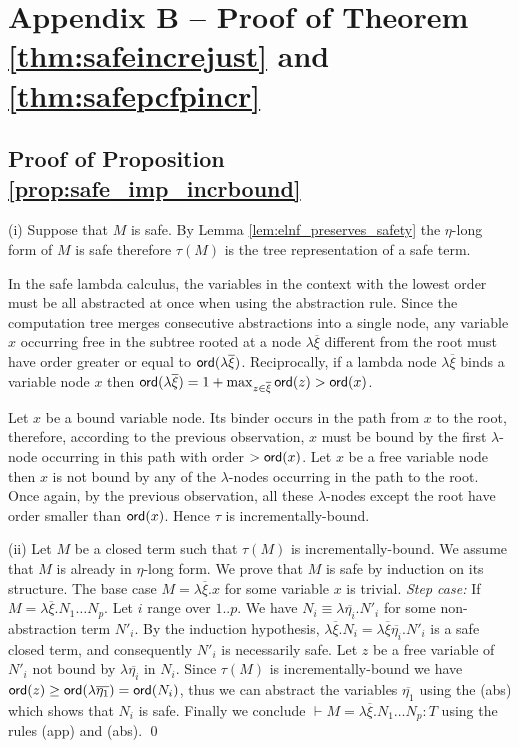 \documentclass{llncs}
\newcommand\ord[1]{{\sf
    ord}(#1)} \newcommand\typear{\rightarrow}
\begin{document}
\section*{Appendix B -- Proof of Theorem \ref{thm:safeincrejust} and \ref{thm:safepcfpincr}}

\subsection{Proof of Proposition \ref{prop:safe_imp_incrbound}}
  (i) Suppose that $M$ is safe. By Lemma
  \ref{lem:elnf_preserves_safety} the $\eta$-long form of $M$ is safe
  therefore $\tau(M)$ is the tree representation of a safe term.

In the safe lambda calculus, the variables in the context with the
lowest order must be all abstracted at once when using the abstraction
rule. Since the computation tree merges consecutive abstractions into
a single node, any variable $x$ occurring free in the subtree rooted
at a node $\lambda \overline{\xi}$ different from the root must have
order greater or equal to $\ord{\lambda
  \overline{\xi}}$. Reciprocally, if a lambda node $\lambda
\overline{\xi}$ binds a variable node $x$ then $\ord{\lambda
  \overline{\xi}} = 1+\max_{z\in\overline{\xi}} \ord{z} > \ord{x}$.

Let $x$ be a bound variable node. Its binder occurs in the path from
$x$ to the root, therefore, according to the previous observation, $x$
must be bound by the first $\lambda$-node occurring in this path with
order $>\ord{x}$. Let $x$ be a free variable node then $x$ is not
bound by any of the $\lambda$-nodes occurring in the path to the
root. Once again, by the previous observation, all these
$\lambda$-nodes except the root have order smaller than
$\ord{x}$. Hence $\tau$ is incrementally-bound.

(ii) Let $M$ be a closed term such that $\tau(M)$ is
incrementally-bound.  We assume that $M$ is already in $\eta$-long
form.  We prove that $M$ is safe by induction on its structure. The
base case $M = \lambda \overline{\xi} . x$ for some variable $x$ is
trivial.  \emph{Step case:} If $M = \lambda \overline{\xi} . N_1
\ldots N_p$.  Let $i$ range over $1..p$. We have $N_i \equiv \lambda
\overline{\eta_i} . N'_i$ for some non-abstraction term $N'_i$. By the induction hypothesis, $\lambda \overline{\xi} . N_i = \lambda \overline{\xi} \overline{\eta_i} . N'_i$ is a safe closed term, and consequently $N'_i$ is necessarily safe. Let $z$ be a free variable
of $N'_i$ not bound by $\lambda \overline{\eta_i}$ in $N_i$. Since
$\tau(M)$ is incrementally-bound we have $\ord{z} \geq \ord{\lambda
  \overline{\eta_1}} = \ord{N_i}$, thus we can abstract the variables $\overline{\eta_1}$ using the {\sf (abs)} which shows that $N_i$ is safe.  Finally
we conclude $\vdash M = \lambda \overline{\xi} . N_1 \ldots N_p : T$ using
the rules {\sf (app)} and {\sf (abs)}.  \qed
\end{document}
